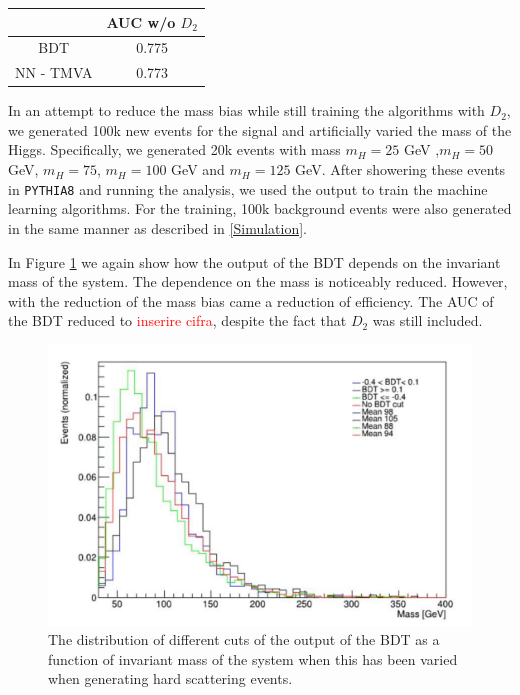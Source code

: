 \documentclass[10pt,a4paper]{book}
\newcommand\todo[1]{\textcolor{red}{#1}}
\def\code#1{\texttt{#1}}
\begin{document}
\begin{table}
\begin{tabular}{|c|c|}
\hline 
\* & AUC w/o $D_2$ \\ 
\hline 
BDT & 0.775 \\ 
\hline 
NN - TMVA & 0.773 \\ 
\hline 
\end{tabular}
\end{table}

In an attempt to reduce the mass bias while still training the algorithms with $D_2$, we generated 100k new events for the signal and artificially varied the mass of the Higgs. Specifically, we generated 20k events with mass $m_H = 25$ GeV ,$m_H = 50$ GeV, $m_H = 75$, $m_H = 100$ GeV and $m_H = 125$ GeV. After showering these events in \code{PYTHIA8} and running the analysis, we used the output to train the machine learning algorithms. For the training, 100k background events were also generated in the same manner as described in \ref{Simulation}.

In Figure \ref{bdt inv mass} we again show how the output of the BDT depends on the invariant mass of the system. The dependence on the mass is noticeably reduced. However, with the reduction of the mass bias came a reduction of efficiency. The AUC of the BDT reduced to \todo{inserire cifra}, despite the fact that $D_2$ was still included.
\begin{figure}
\centering
\includegraphics[scale=0.5]{ch4_images/bdt_inv_mass}
\caption{The distribution of different cuts of the output of the BDT as a function of invariant mass of the system when this has been varied when generating hard scattering events.}
\label{bdt inv mass}
\end{figure}
\end{document}
